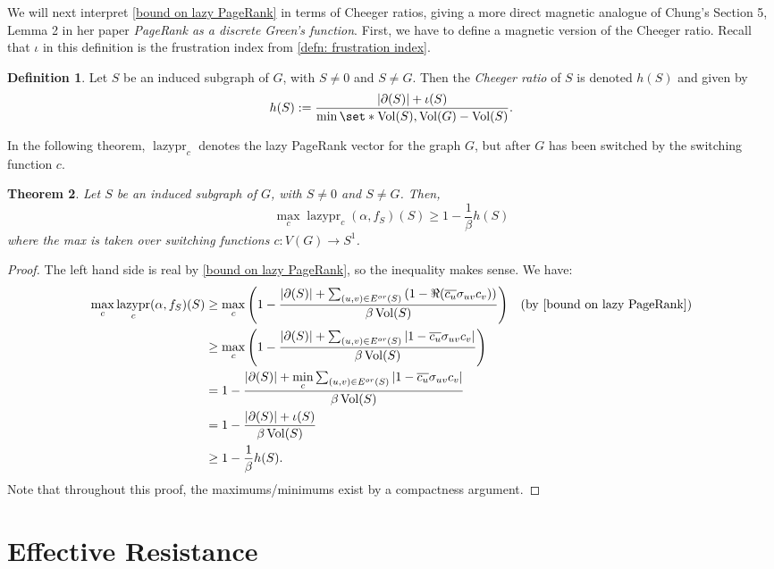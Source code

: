 \documentclass[12pt]{article}
\newtheorem{thm}{Theorem}
\theoremstyle{definition}
\newtheorem{defn}[thm]{Definition}
\DeclarePairedDelimiter\abs{\lvert}{\rvert}
\DeclareMathOperator{\lazypr}{lazypr}
\DeclareMathOperator{\vol}{Vol}
\begin{document}
We will next interpret \cref{bound on lazy PageRank} in terms of Cheeger ratios, giving a more direct magnetic analogue of Chung's Section 5, Lemma 2 in her paper \textit{PageRank as a discrete Green's function}. First, we have to define a magnetic version of the Cheeger ratio. Recall that $\iota$ in this definition is the frustration index from \cref{defn: frustration index}.

\begin{defn}
Let $S$ be an induced subgraph of $G$, with $S \neq 0$ and $S \neq G$. Then the \textit{Cheeger ratio} of $S$ is denoted $h(S)$ and given by
$$
h(S) := \frac{\abs*{\partial (S)} + \iota(S)}{\min \set*{\vol(S), \vol(G) - \vol(S)}}.
$$
\end{defn}

In the following theorem, $\lazypr_c$ denotes the lazy PageRank vector for the graph $G$, but after $G$ has been switched by the switching function $c$.

\begin{thm}
Let $S$ be an induced subgraph of $G$, with $S \neq 0$ and $S \neq G$. Then,
$$
\max_{c} \lazypr_c (\alpha, f_S) (S) \geq 1 - \frac{1}{\beta} h(S)
$$
where the max is taken over switching functions $c: V(G) \rightarrow S^1$.
\end{thm}
\begin{proof}
The left hand side is real by \cref{bound on lazy PageRank}, so the inequality makes sense. We have:
\begin{align*}
\max_{c} \lazypr_c (\alpha, f_S) (S)
&\geq \max_{c} \left( 1 - \frac{\abs*{\partial(S)} + \sum_{(u,v) \in E^{or}(S)}{(1 - \Re(\overline{c_u} \sigma_{uv} c_v))}}{\beta \vol (S)} \right) && \text{(by \cref{bound on lazy PageRank})} \\
& \geq \max_{c} \left( 1 - \frac{\abs*{\partial(S)} + \sum_{(u,v) \in E^{or}(S)}{\abs*{1 - \overline{c_u} \sigma_{uv} c_v}}}{\beta \vol (S)} \right) \\
&= 1 - \frac{\abs*{\partial(S)} + \min\limits_c \sum_{(u,v) \in E^{or}(S)}{\abs*{1 - \overline{c_u} \sigma_{uv} c_v}}}{\beta \vol (S)} \\
&= 1 - \frac{\abs*{\partial(S)} + \iota(S)}{\beta \vol (S)} \\
&\geq 1 - \frac{1}{\beta} h(S).
\end{align*}
Note that throughout this proof, the maximums/minimums exist by a compactness argument.
\end{proof}

\section{Effective Resistance}
\end{document}
